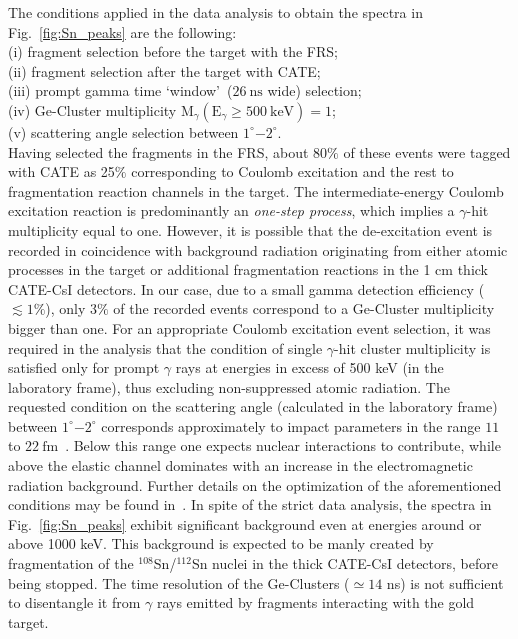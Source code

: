 \documentclass[prc,twocolumn,amssymb,amsmath,showpacs,superscriptaddress]{revtex4}
\begin{document}
The conditions applied in the data analysis to obtain the spectra
in Fig.~\ref{fig:Sn_peaks} are the following:\\
(i) fragment selection before the target with the FRS;\\
(ii) fragment selection after the target with CATE;\\
(iii) prompt gamma time \textquoteleft window\textquoteright\
($26\ \text{ns}$ wide) selection;\\
(iv) Ge-Cluster multiplicity $\text{M}_{\gamma}(\text{E}_{\gamma}
\geq 500\ \text{keV}) = 1$;\\
(v) scattering angle selection between $1^{\circ}$$-$$2^{\circ}$.\\
Having selected the fragments in the FRS, about 80$\%$ of these
events were tagged with CATE as 25$\%$ corresponding to Coulomb
excitation and the rest to fragmentation reaction channels in the
target. The intermediate-energy Coulomb excitation reaction is
predominantly an \textit{one-step process}, which implies a
$\gamma$-hit multiplicity equal to one. However, it is possible
that the de-excitation event is recorded in coincidence with
background radiation originating from either atomic processes in
the target or additional fragmentation reactions in the 1 cm thick
CATE-CsI detectors. In our case, due to a small gamma detection
efficiency ($\lesssim 1\%$), only 3$\%$ of the recorded events
correspond to a Ge-Cluster multiplicity bigger than one. For an
appropriate Coulomb excitation event selection, it was required in
the analysis that the condition of single $\gamma$-hit cluster
multiplicity is satisfied only for prompt $\gamma$ rays at
energies in excess of 500 keV (in the laboratory frame), thus
excluding non-suppressed atomic radiation.  The requested
condition on the scattering angle (calculated in the laboratory
frame) between $1^{\circ}$$-$$2^{\circ}$ corresponds approximately
to impact parameters in the range $11$ to $22\
\text{fm}$~\cite{ban05}. Below this range one expects nuclear
interactions to contribute, while above the elastic channel
dominates with an increase in the electromagnetic radiation
background. Further details on the optimization of the
aforementioned conditions may be found in~\cite{ban05}. In spite
of the strict data analysis, the spectra in
Fig.~\ref{fig:Sn_peaks} exhibit significant background even at
energies around or above 1000 keV. This background is expected
\cite{wol05} to be manly created by fragmentation of the
$^{108}$Sn/$^{112}$Sn nuclei in the thick CATE-CsI detectors,
before being stopped. The time resolution of the Ge-Clusters
($\simeq 14$ ns) is not sufficient to disentangle it from $\gamma$
rays emitted by fragments interacting with the gold target.
\end{document}
